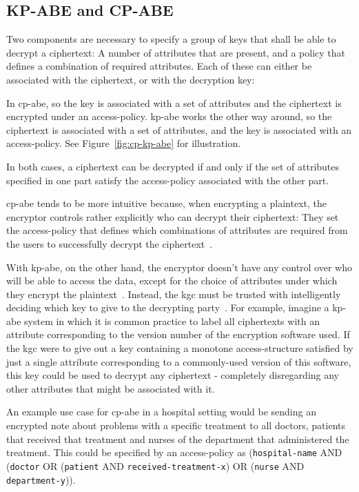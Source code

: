 \subsection{KP-ABE and CP-ABE}\label{sec:cp-vs-kp}

Two components are necessary to specify a group of keys that shall be able to decrypt a ciphertext: A number of attributes that are present, and a policy that defines a combination of required attributes. 
Each of these can either be associated with the ciphertext, or with the decryption key:

In \acrfull{cp-abe}, so the key is associated with a set of attributes and the ciphertext is encrypted under an \gls{access-policy}.
\acrfull{kp-abe} works the other way around, so the ciphertext is associated with a set of attributes, and the key is associated with an \gls{access-policy}.
See Figure~\ref{fig:cp-kp-abe} for illustration.

In both cases, a ciphertext can be decrypted if and only if the set of attributes specified in one part satisfy the \gls{access-policy} associated with the other part.

\acrshort{cp-abe} tends to be more intuitive because, when encrypting a plaintext, the encryptor controls rather explicitly who can decrypt their ciphertext:
They set the \gls{access-policy} that defines which combinations of attributes are required from the users to successfully decrypt the ciphertext~\cite{bethencourt_ciphertext-policy_2007}.

With \acrshort{kp-abe}, on the other hand, the encryptor doesn't have any control over who will be able to access the data, except for the choice of attributes under which they encrypt the plaintext~\cite{bethencourt_ciphertext-policy_2007}.
Instead, the \acrlong{kgc} must be trusted with intelligently deciding which key to give to the decrypting party~\cite{bethencourt_ciphertext-policy_2007}.
For example, imagine a \acrshort{kp-abe} system in which it is common practice to label all ciphertexts with an attribute corresponding to the version number of the encryption software used.
If the \acrshort{kgc} were to give out a key containing a monotone \gls{access-structure} satisfied by just a single attribute corresponding to a commonly-used version of this software, this key could be used to decrypt any ciphertext - completely disregarding any other attributes that might be associated with it.

An example use case for \acrshort{cp-abe} in a hospital setting would be sending an encrypted note about problems with a specific treatment to all doctors, patients that received that treatment and nurses of the department that administered the treatment.
This could be specified by an \gls{access-policy} as (\texttt{hospital-name} AND (\texttt{doctor} OR (\texttt{patient} AND \texttt{received-treatment-x}) OR (\texttt{nurse} AND \texttt{department-y})). %

